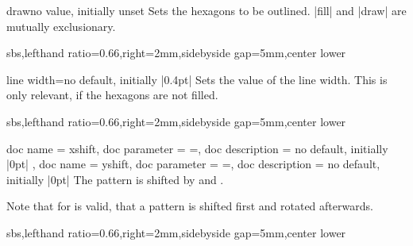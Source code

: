 \documentclass[a4paper,11pt]{article}
\begin{document}
\begin{docPatternKey}{draw}{}{no value, initially unset}
  Sets the hexagons to be outlined. |fill| and |draw| are mutually exclusionary.
\begin{dispExample*}{sbs,lefthand ratio=0.66,right=2mm,sidebyside gap=5mm,center lower}
\end{dispExample*}
\end{docPatternKey}


\begin{docPatternKey}{line width}{=}{no default, initially |0.4pt|}
  Sets the  value of the line width.
  This is only relevant, if the hexagons are not filled.
\begin{dispExample*}{sbs,lefthand ratio=0.66,right=2mm,sidebyside gap=5mm,center lower}
\end{dispExample*}
\end{docPatternKey}



\begin{docPatternKeys}
  {
    {
      doc name        = xshift,
      doc parameter   = {=},
      doc description = {no default, initially |0pt|}
    },
    {
      doc name        = yshift,
      doc parameter   = {=},
      doc description = {no default, initially |0pt|}
    }
  }
  The pattern is shifted by  and .
  \par
  Note that for  is valid, that a pattern is shifted first and rotated afterwards.
\begin{dispExample*}{sbs,lefthand ratio=0.66,right=2mm,sidebyside gap=5mm,center lower}
\end{dispExample*}
\end{docPatternKeys}
\end{document}
